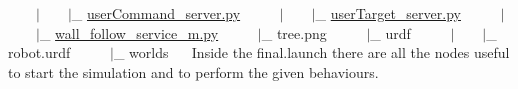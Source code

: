  ~~~~$\vert$~~~~$\vert$\+\_\+ \hyperlink{user_command__server_8py}{user\+Command\+\_\+server.\+py}~\newline
 ~~~~$\vert$~~~~$\vert$\+\_\+ \hyperlink{user_target__server_8py}{user\+Target\+\_\+server.\+py}~\newline
 ~~~~$\vert$~~~~$\vert$\+\_\+ \hyperlink{wall__follow__service__m_8py}{wall\+\_\+follow\+\_\+service\+\_\+m.\+py}~\newline
 ~~~~$\vert$\+\_\+ tree.\+png~\newline
 ~~~~$\vert$\+\_\+ urdf~\newline
 ~~~~$\vert$~~~~$\vert$\+\_\+ robot.\+urdf~\newline
 ~~~~$\vert$\+\_\+ worlds~\newline
~\newline
 Inside the final.\+launch there are all the nodes useful to start the simulation and to perform the given behaviours. 